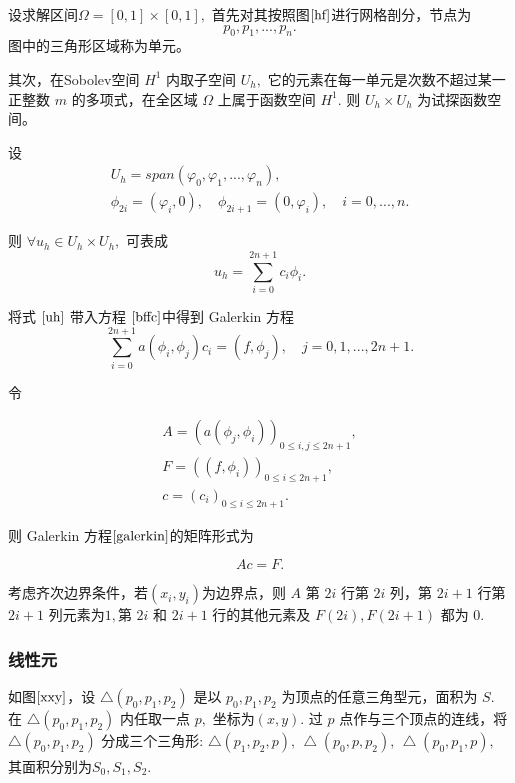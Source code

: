 \documentclass[a4paper,UTF8,titlepage,10pt]{ctexart}
\numberwithin{equation}{subsection}
\begin{document}
设求解区间$\Omega = [0,1] \times [0,1],$ 首先对其按照图$\ref{hf}$进行网格剖分，节点为
$$
p_0, p_1, ... , p_n .
$$
图中的三角形区域称为单元。

其次，在Sobolev空间 $H^1$ 内取子空间 $U_h,$ 它的元素在每一单元是次数不超过某一正整数 $m$ 的多项式，在全区域 $\Omega$ 上属于函数空间 $H^1.$ 则 $U_h \times U_h$ 为试探函数空间。

设
$$
\begin{matrix}
	U_h = span(\varphi_0, \varphi_1, ... , \varphi_n) , \\
	\phi_{2i} = (\varphi_i, 0), \quad \phi_{2i+1} = (0, \varphi_i), \quad i=0,...,n .
\end{matrix}
$$

则 $\forall u_h \in U_h \times U_h,$ 可表成
\begin{equation}
	u_h = \sum\limits_{i=0}^{2n+1} c_i \phi_i .
	\label{uh}
\end{equation}

将式 $\eqref{uh}$ 带入方程 $\eqref{bffc}$中得到 Galerkin 方程
\begin{equation}
	\sum\limits_{i=0}^{2n+1} a(\phi_i, \phi_j) c_i = (f,\phi_j), \quad j = 0, 1, ... , 2n+1 .
	\label{galerkin}
\end{equation} 

令

$$
\begin{matrix}
	A = (a(\phi_j, \phi_i))_{0 \le i,j \le 2n+1} , \\
	F = ((f,\phi_i))_{0 \le i \le 2n+1} , \\
	c = (c_i)_{0 \le i \le 2n+1} .
\end{matrix}
$$

则 Galerkin 方程$\eqref{galerkin}$的矩阵形式为

\begin{equation}
	Ac = F .
\end{equation}

考虑齐次边界条件，若$(x_i,y_i)$为边界点，则 $A$ 第 $2i$ 行第 $2i$ 列，第 $2i+1$ 行第 $2i+1$ 列元素为$1,$第 $2i$ 和 $2i+1$ 行的其他元素及  $F(2i),F(2i+1)$ 都为 $0.$

\subsubsection{线性元}

如图$\ref{xxy}$，设 $ \bigtriangleup(p_0,p_1,p_2) $ 是以 $p_0,p_1,p_2$ 为顶点的任意三角型元，面积为 $S.$ 在 $ \bigtriangleup (p_0,p_1,p_2) $ 内任取一点 $p,$ 坐标为$(x,y).$ 过 $p$ 点作与三个顶点的连线，将 $ \bigtriangleup(p_0,p_1,p_2) $ 分成三个三角形: $ \bigtriangleup(p_1,p_2,p), \, \bigtriangleup(p_0,p,p_2), \, \bigtriangleup(p_0,p_1,p),$ 其面积分别为$S_0,S_1,S_2.$ \textsuperscript{\cite{李荣华2007偏微分方程数值解}}
\end{document}
